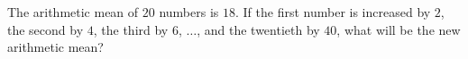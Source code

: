 The arithmetic mean of $20$ numbers is $18$. If the first number is increased by $2$, the second by $4$, the third by $6$, $\ldots$, and the twentieth by $40$, what will be the new arithmetic mean?
